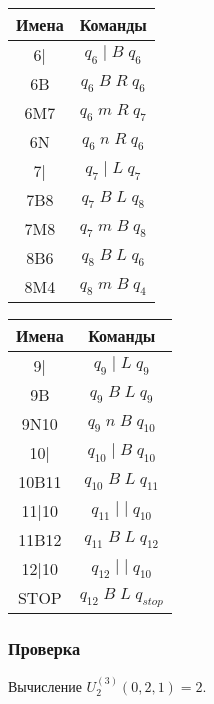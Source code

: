 \documentclass[a4paper, 12pt]{article}  %
\theoremstyle{definition}
\begin{document}
\begin{multicols}{4}
		\begin{tabular}{ | c | c |  }
			\hline
			Имена & Команды \\ 
			\hline
			6| & $q_6 \; | \; B \; q_6$ \\
			6B & $q_6 \; B \; R \; q_6$ \\
			6M7 & $q_6 \; m \; R \; q_7$ \\
			6N & $q_6 \; n \; R \; q_6$ \\
			\hline
			7| & $q_7 \; | \; L \; q_7$ \\
			7B8 & $q_7 \; B \; L \; q_8$ \\
			7M8 & $q_7 \; m \; B \; q_8$ \\
			\hline
			8B6 & $q_8 \; B \; L \; q_6$ \\
			8M4 & $q_8 \; m \; B \; q_4$ \\
			\hline
		\end{tabular}
		
		\begin{tabular}{ | c | c |  }
			\hline
			Имена & Команды \\ 
			\hline
			9| & $q_9 \; | \; L \; q_9$ \\
			9B & $q_9 \; B \; L \; q_9$ \\
			9N10 & $q_9 \; n \; B \; q_{10}$ \\
			\hline
			10| & $q_{10} \; | \; B \; q_{10}$ \\
			10B11 & $q_{10} \; B \; L \; q_{11}$ \\
			\hline
			11|10 & $q_{11} \; | \; | \; q_{10}$ \\
			11B12 & $q_{11} \; B \; L \; q_{12}$ \\
			\hline
			12|10 & $q_{12} \; | \; | \; q_{10}$ \\
			STOP & $q_{12} \; B \; L \; q_{stop}$ \\
			\hline
		\end{tabular}
	\end{multicols}
	
	\subsubsection*{Проверка}
	Вычисление $U^{(3)}_2 (0, 2, 1) = 2$.
	
\end{document}
